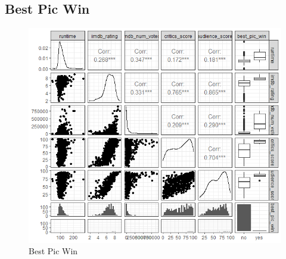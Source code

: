 \documentclass[12pt,letterpaper]{article}
\begin{document}
	\vspace{1cm}
	
	\newpage
	
\subsection*{Best Pic Win}

  

\begin{figure}[h!]\centering
	\caption{\footnotesize Best Pic Win }
	\label{fig:plot_5}
	\includegraphics[width=.75\textwidth]{best pic win 2.png}
\end{figure}


	\vspace{1cm}
\end{document}
